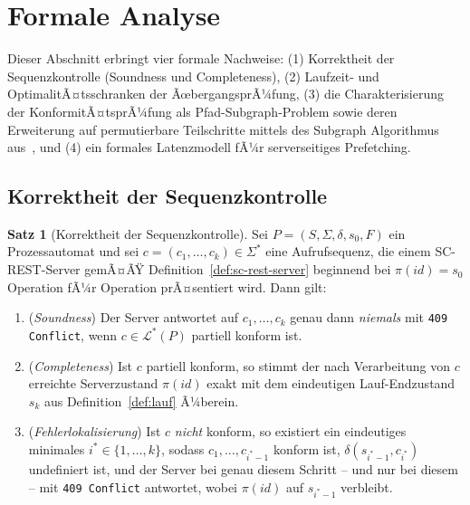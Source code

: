 ﻿\documentclass[a4paper,12pt]{article}
\theoremstyle{definition}
\newtheorem{satz}{Satz}
\begin{document}
\section{Formale Analyse}
\label{sec:analyse}

Dieser Abschnitt erbringt vier formale Nachweise: (1) Korrektheit der Sequenzkontrolle
(Soundness und Completeness), (2) Laufzeit- und OptimalitÃ¤tsschranken der
ÃœbergangsprÃ¼fung, (3) die Charakterisierung der KonformitÃ¤tsprÃ¼fung als
Pfad-Subgraph-Problem sowie deren Erweiterung auf permutierbare Teilschritte mittels des
Subgraph Algorithmus aus~\cite{epp2026subgraph}, und (4) ein formales Latenzmodell fÃ¼r
serverseitiges Prefetching.

\subsection{Korrektheit der Sequenzkontrolle}

\begin{satz}[Korrektheit der Sequenzkontrolle]
	\label{satz:korrektheit}
	Sei $P=(S,\Sigma,\delta,s_0,F)$ ein Prozessautomat und sei
	$c=(c_1,\ldots,c_k)\in\Sigma^*$ eine Aufrufsequenz, die einem SC-REST-Server gemÃ¤ÃŸ
	Definition~\ref{def:sc-rest-server} beginnend bei $\pi(id)=s_0$ Operation fÃ¼r
	Operation prÃ¤sentiert wird. Dann gilt:
	\begin{enumerate}
		\item[(a)] (\emph{Soundness}) Der Server antwortet auf $c_1,\ldots,c_k$ genau dann
		      \emph{niemals} mit \texttt{409 Conflict}, wenn $c \in \mathcal{L}^*(P)$
		      partiell konform ist.
		\item[(b)] (\emph{Completeness}) Ist $c$ partiell konform, so stimmt der nach
		      Verarbeitung von $c$ erreichte Serverzustand $\pi(id)$ exakt mit dem
		      eindeutigen Lauf-Endzustand $s_k$ aus Definition~\ref{def:lauf} Ã¼berein.
		\item[(c)] (\emph{Fehlerlokalisierung}) Ist $c$ \emph{nicht} konform, so existiert
		      ein eindeutiges minimales $i^\ast \in \{1,\ldots,k\}$, sodass
		      $c_1,\ldots,c_{i^\ast-1}$ konform ist, $\delta(s_{i^\ast-1},c_{i^\ast})$
		      undefiniert ist, und der Server bei genau diesem Schritt -- und nur bei
		      diesem -- mit \texttt{409 Conflict} antwortet, wobei $\pi(id)$ auf
		      $s_{i^\ast-1}$ verbleibt.
	\end{enumerate}
\end{satz}
\end{document}
